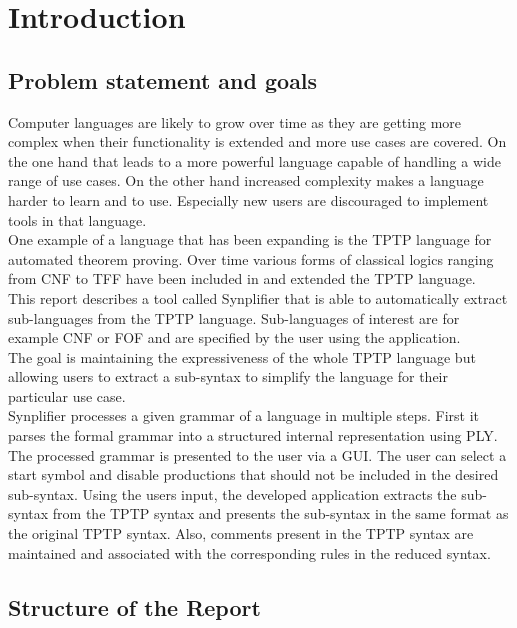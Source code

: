 
\chapter{Introduction}\label{cha:Introduction}

\section{Problem statement and goals}\label{sec:Aufgabenstellung}

Computer languages are likely to grow over time as they are getting more complex when their functionality is extended and more use cases are covered.
On the one hand that leads to a more powerful language capable of handling a wide range of use cases.
On the other hand increased complexity makes a language harder to learn and to use. Especially new users are discouraged to implement tools in that language.\\
One example of a language that has been expanding is the \ac{TPTP} language for automated theorem proving. Over time
various forms of classical logics ranging from \ac{CNF} to \ac{TFF} have been included in and extended the \ac{TPTP} language. \\
This report describes a tool called \ac{Synplifier} that is able to automatically extract sub-languages from the \ac{TPTP} language. Sub-languages of interest are for example \ac{CNF} or \ac{FOF} and are specified by the user using the application.\\
The goal is maintaining the expressiveness of the whole \ac{TPTP} language but allowing users to extract a sub-syntax to simplify the language for their particular use case. \\
\ac{Synplifier} processes a given grammar of a language in multiple steps.
First it parses the formal grammar into a structured internal representation using \ac{PLY}.
The processed grammar is presented to the user via a GUI. The user can select a start symbol and disable productions that should not be included in the desired sub-syntax.
Using the users input, the developed application extracts the sub-syntax from the \ac{TPTP} syntax and presents the sub-syntax in the same format as the original \ac{TPTP} syntax.
Also, comments present in the \ac{TPTP} syntax are maintained and associated with the corresponding rules in the reduced syntax.

\section{Structure of the Report}\label{sec:IntroductionStructure}

